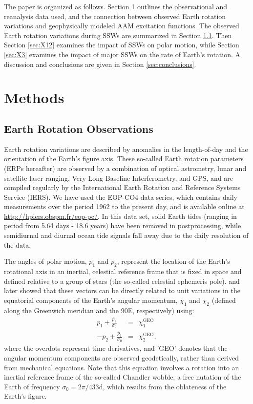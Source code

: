 \documentclass[draft,jgrga]{agutex}
\begin{document}
\begin{article}
The paper is organized as follows.
Section \ref{sec:method} outlines the observational and reanalysis data used, and the connection between observed Earth rotation variations and geophysically modeled AAM excitation functions.
 {The observed Earth rotation variations during SSWs are summarized in Section} \ref{sec:ERPobs}. 
Then Section \ref{sec:X12} examines the impact of SSWs on polar motion, while Section \ref{sec:X3}  examines the impact of major SSWs on the rate of Earth's rotation.
A discussion and conclusions are given in Section \ref{sec:conclusions}.


\section{Methods}
\label{sec:method}


\subsection{Earth Rotation Observations}
\label{sec:ERPobs}
 {Earth rotation variations are described by anomalies in the length-of-day and the orientation of the Earth's figure axis. 
These so-called Earth rotation parameters (ERPs hereafter) are observed by a combination of optical astrometry, lunar and satellite laser ranging, Very Long Baseline Interferometry, and GPS, and are compiled regularly by the International Earth Rotation and Reference Systems Service (IERS).}
We have used the EOP-CO4 data series, which contains daily measurements over the period 1962 to the present day, and is available online at \url{http://hpiers.obspm.fr/eop-pc/}.
In this data set, solid Earth tides (ranging in period from 5.64 days - 18.6 years) have been removed in postprocessing, while semidiurnal and diurnal ocean tide signals fall away due to the daily resolution of the data.

 {The angles of polar motion, $p_1$ and $p_2$, represent the location of the Earth's rotational axis in an inertial, celestial reference frame that is fixed in space and defined relative to a group of stars (the so-called celestial ephemeris pole).}
\citet{barnesetal1983} and later \citet{Gross1992}  { showed that these vectors can be directly related to unit variations in 
the equatorial components of the Earth's angular momentum, $\chi_1$ and $\chi_2$ (defined along the Greenwich meridian and the 90\degree E, respectively) using:}
\begin{eqnarray}
  p_1 + \frac{\dot{p_2}}{\sigma_0} &=& \chi_1^{\text{GEO}} \label{eq:PM1_to_AEF} \\
  -p_2 + \frac{\dot{p_1}}{\sigma_0} &=& \chi_2^{\text{GEO}}, \label{eq:PM2_to_AEF}
\end{eqnarray}
 {where the overdots represent time derivatives, and 'GEO' denotes that the angular momentum components are observed geodetically, rather than derived from mechanical equations.}
Note that this equation involves a rotation into an inertial reference frame 
of the so-called Chandler wobble, a free nutation of the Earth of frequency 
$\sigma_0 = 2\pi/ 433\text{d}$, which results from the oblateness of the Earth's figure.



\end{article}
\end{document}
